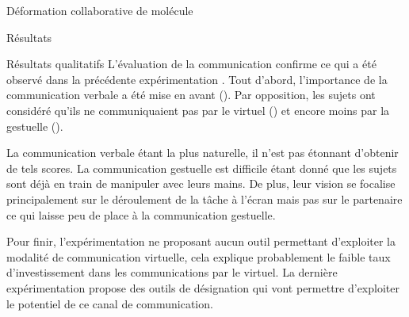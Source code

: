 \documentclass[myfrancais,ngerman,english,french]{mythesis}
\begin{document}
\begin{mychapter}{Déformation collaborative de molécule}
\begin{mysection}{Résultats}
\begin{mysubsection}{Résultats qualitatifs}
				L'évaluation de la communication confirme ce qui a été observé dans la précédente expérimentation .
				Tout d'abord, l'importance de la communication verbale a été mise en avant ().
				Par opposition, les sujets ont considéré qu'ils ne communiquaient pas par le virtuel () et encore moins par la gestuelle ().

				La communication verbale étant la plus naturelle, il n'est pas étonnant d'obtenir de tels scores.
				La communication gestuelle est difficile étant donné que les sujets sont déjà en train de manipuler avec leurs mains.
				De plus, leur vision se focalise principalement sur le déroulement de la tâche à l'écran mais pas sur le partenaire ce qui laisse peu de place à la communication gestuelle.

				Pour finir, l'expérimentation ne proposant aucun outil permettant d'exploiter la modalité de communication virtuelle, cela explique probablement le faible taux d'investissement dans les communications par le virtuel.
				La dernière expérimentation  propose des outils de désignation qui vont permettre d'exploiter le potentiel de ce canal de communication.


\end{mysubsection}
\end{mysection}
\end{mychapter}
\end{document}
